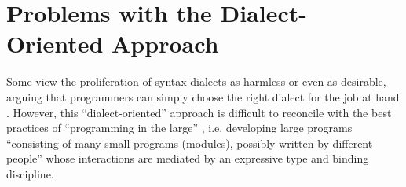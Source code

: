
\vspace{-5px}
\section{Problems with the Dialect-Oriented Approach}\label{sec:problems-with-dialects}
Some  view the proliferation of syntax dialects as harmless or even as desirable, arguing that programmers can simply choose the right dialect for the job at hand \cite{journals/stp/Ward94}. However, this ``dialect-oriented'' approach is difficult to reconcile with the best practices of ``programming in the large'' \cite{DeRemer76}, i.e. developing large programs ``consisting of many small programs (modules), possibly written by different people'' whose interactions are mediated by an expressive type and binding discipline.


